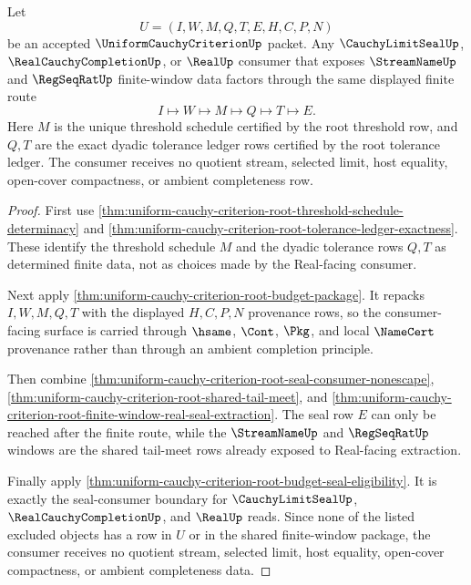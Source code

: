 \begin{theorem}
\label{thm:uniform-cauchy-threshold-seal-budget-factorization}
Let
$$
U=(I,W,M,Q,T,E,H,C,P,N)
$$
be an accepted $\UniformCauchyCriterionUp$ packet. Any $\CauchyLimitSealUp$, $\RealCauchyCompletionUp$, or $\RealUp$ consumer that exposes $\StreamNameUp$ and $\RegSeqRatUp$ finite-window data factors through the same displayed finite route
$$
I \longmapsto W \longmapsto M \longmapsto Q \longmapsto T \longmapsto E.
$$
Here $M$ is the unique threshold schedule certified by the root threshold row, and $Q,T$ are the exact dyadic tolerance ledger rows certified by the root tolerance ledger. The consumer receives no quotient stream, selected limit, host equality, open-cover compactness, or ambient completeness row.
\end{theorem}
\begin{proof}
First use \autoref{thm:uniform-cauchy-criterion-root-threshold-schedule-determinacy} and \autoref{thm:uniform-cauchy-criterion-root-tolerance-ledger-exactness}. These identify the threshold schedule $M$ and the dyadic tolerance rows $Q,T$ as determined finite data, not as choices made by the Real-facing consumer.

Next apply \autoref{thm:uniform-cauchy-criterion-root-budget-package}. It repacks $I,W,M,Q,T$ with the displayed $H,C,P,N$ provenance rows, so the consumer-facing surface is carried through $\hsame$, $\Cont$, $\Pkg$, and local $\NameCert$ provenance rather than through an ambient completion principle.

Then combine \autoref{thm:uniform-cauchy-criterion-root-seal-consumer-nonescape}, \autoref{thm:uniform-cauchy-criterion-root-shared-tail-meet}, and \autoref{thm:uniform-cauchy-criterion-root-finite-window-real-seal-extraction}. The seal row $E$ can only be reached after the finite route, while the $\StreamNameUp$ and $\RegSeqRatUp$ windows are the shared tail-meet rows already exposed to Real-facing extraction.

Finally apply \autoref{thm:uniform-cauchy-criterion-root-budget-seal-eligibility}. It is exactly the seal-consumer boundary for $\CauchyLimitSealUp$, $\RealCauchyCompletionUp$, and $\RealUp$ reads. Since none of the listed excluded objects has a row in $U$ or in the shared finite-window package, the consumer receives no quotient stream, selected limit, host equality, open-cover compactness, or ambient completeness data.
\end{proof}

